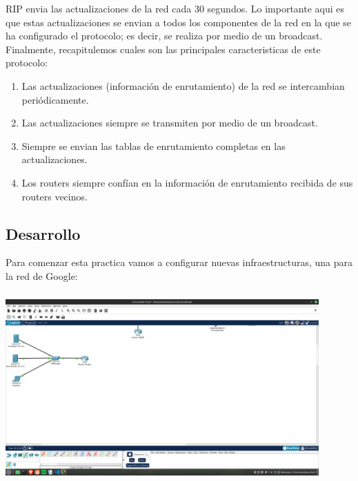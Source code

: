 \documentclass[14pt]{book}
\begin{document}
RIP envia las actualizaciones de la red cada 30 segundos. Lo importante aqui es que estas
actualizaciones se envian a todos los componentes de la red en la que se ha configurado el protocolo;
es decir, se realiza por medio de un broadcast.\\

Finalmente, recapitulemos cuales son las principales caracteristicas de este protocolo:\\

\begin{enumerate}
  \item Las actualizaciones (información de enrutamiento) de la red se intercambian periódicamente.
  \item Las actualizaciones siempre se transmiten por medio de un broadcast.
  \item Siempre se envian las tablas de enrutamiento completas en las actualizaciones.
  \item Los routers siempre confían en la información de enrutamiento recibida de sus routers vecinos.
\end{enumerate}

\vspace{2em}

{\color{red} \subsection*{\textbf{Desarrollo}}}
\vspace{1em}

Para comenzar esta practica vamos a configurar nuevas infraestructuras, una para la red de Google:\\

\includegraphics[width=12cm, height=8cm]{images/redgoogle.png}\\
\end{document}
